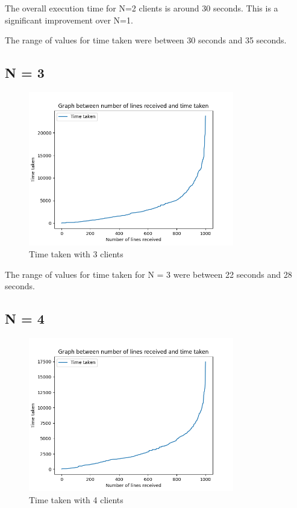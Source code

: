 \documentclass[12pt]{scrartcl}
\begin{document}
The overall execution time for N=2 clients is around 30 seconds. This is a significant improvement over N=1. 

The range of values for time taken were between 30 seconds and 35 seconds.

\subsection{N = 3}

\begin{figure}[H]
    \centering
    \includegraphics[width=0.8\textwidth]{images/latency_n_3.png}
    \caption{Time taken with 3 clients}
    \label{fig:my_label}
\end{figure}

The range of values for time taken for N = 3 were between 22 seconds and 28 seconds.

\subsection{N = 4}

\begin{figure}[H]
    \centering
    \includegraphics[width=0.8\textwidth]{images/latency_n_4.png}
    \caption{Time taken with 4 clients}
    \label{fig:my_label}
\end{figure}
\end{document}
